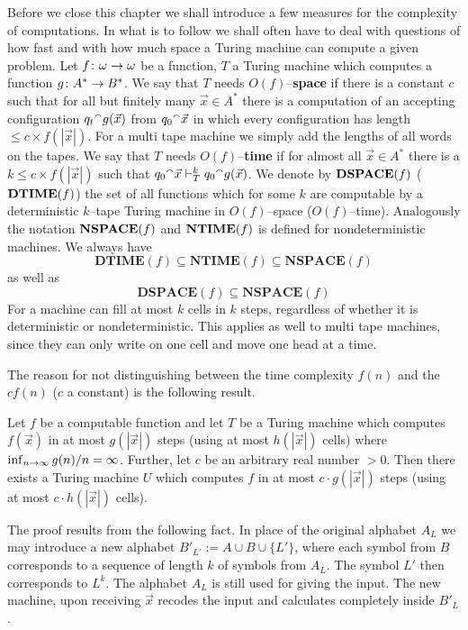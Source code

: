 Before we close this chapter we shall introduce a few measures for
the complexity of computations. In what is to follow we shall
often have to deal with questions of how fast and with how much
space a Turing machine can compute a given problem.  Let $f \colon
\omega \rightarrow \omega$ be a function, $T$ a Turing machine which
computes a function $g \colon A^{\ast} \rightarrow B^{\ast}$. We say that $T$
needs $O(f)$--\textbf{space} if there is a constant $c$ such that for
all but finitely many $\vec{x} \in A^{\ast}$ there is a
computation of an accepting configuration $q_t {^{\smallfrown}} g(\vec{x})$ 
from $q_0 {^{\smallfrown}} \vec{x}$ in which every configuration has length 
$\leq c \times f(|\vec{x}|)$. 
For a multi tape machine we simply add the
lengths of all words on the tapes. We say that $T$ needs
$O(f)$--\textbf{time} if for almost all $\vec{x} \in A^{\ast}$ there
is a $k \leq c \times f(|\vec{x}|)$ such that $q_0 {^{\smallfrown}} \vec{x}
\vdash_T^{k} q_0 {^{\smallfrown}} g(\vec{x})$. We denote by $\mbox{\bf
DSPACE}(f)$ ($\mbox{\bf DTIME}(f)$)  the set of all functions
which for some $k$ are computable by a deterministic $k$--tape
Turing machine in $O(f)$--space ($O(f)$--time). Analogously the
notation $\mbox{\bf NSPACE}(f)$ and $\mbox{\bf NTIME}(f)$ is
defined for nondeterministic machines. We always have
\begin{equation}
\mathbf{DTIME}(f) \subseteq \mathbf{NTIME}(f)
\subseteq \mathbf{NSPACE}(f)
\end{equation}
as well as
\begin{equation}
\mathbf{DSPACE}(f) \subseteq \mathbf{NSPACE}(f) 
\end{equation}
For a machine can fill at most $k$ cells in $k$ steps, regardless 
of whether it is deterministic or nondeterministic. This applies 
as well to multi tape machines, since they can only write on one 
cell and move one head at a time.

The reason for not distinguishing  between the time complexity 
$f(n)$ and the $cf(n)$ ($c$ a constant) is the following result.
\begin{thm}
\label{thm:speedup}
Let $f$ be a computable function and let $T$ be a Turing machine
which computes $f(\vec{x})$  in at most
$g(|\vec{x}|)$ steps (using at most $h(|\vec{x}|)$ cells) where
$\inf_{n \rightarrow \infty} g(n)/n = \infty$.
Further, let $c$ be an arbitrary real number $> 0$. Then there
exists a Turing machine $U$ which computes $f$ in at most
$c \cdot g(|\vec{x}|)$ steps (using at most $c \cdot h(|\vec{x}|)$
cells).
\end{thm}
The proof results from the following fact. In place of the original 
alphabet $A_L$ we may introduce a new alphabet $B'_{L'} :=  A \cup B 
\cup \{L'\}$, where each symbol from $B$ corresponds to a sequence 
of length $k$ of symbols from $A_L$. The symbol $L'$ then corresponds 
to $L^k$. The alphabet $A_L$ is still used for giving the input. The 
new machine, upon receiving $\vec{x}$ recodes the input and calculates 
completely inside $B'_L$.

